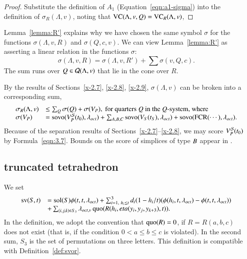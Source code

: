 \begin{proof} Substitute the definition of $A_1$
(Equation~\ref{eqn:a1-sigma}) into the definition of
$\sigma_R(\Lambda,v)$, noting that ${\operatorname{VC}}(\Lambda,v,Q) 
= {\operatorname{VC}}_{R}(\Lambda,v)$,
\end{proof}

\begin{remark}   Lemma~\ref{lemma:R'} explains why we have chosen
the same symbol $\sigma$ for the functions $\sigma(\Lambda,v,R)$ and
$\sigma(Q,c,v)$.  We can view Lemma~\ref{lemma:R'} as asserting a
linear relation in the functions $\sigma$:
   $$\sigma(\Lambda,v,R) = \sigma(\Lambda,v,R') + \sum \sigma(v,Q,c).$$
The sum runs over $Q\in{\mathcal Q}(\Lambda,v)$ that lie in the cone over $R$.
\end{remark}


By the results of Sections~\ref{x-2.7}, \ref{x-2.8}, \ref{x-2.9},
$\sigma(\Lambda,v)$ can be broken into a corresponding sum,
    $$
    \begin{array}{lll}
    \sigma_R(\Lambda,v) &\le \sum_Q \sigma(Q) + \sigma(V_P),
                \hbox{ for quarters $Q$ in the $Q$-system, where}\\
    \sigma(V_P) &= {\operatorname{sovo}}(V^{{\mathcal S}}_P(t_0),\lambda_{oct})+  \sum_{A,B,C} {\operatorname{sovo}}(V_S(t_S),\lambda_{oct})
        +{\operatorname{sovo}}({\operatorname{FCR}}(\cdots),\lambda_{oct}).\\
    \end{array}
    $$
Because of the separation
results of Sections~\ref{x-2.7}--\ref{x-2.8},  we may score
$V^{{\mathcal S}}_P(t_0)$ by Formula~\ref{eqn:3.7}. Bounds on the score of
simplices of type $B$ appear in .



\subsection{truncated tetrahedron}


We set
    \begin{equation}
    \begin{array}{lll}
    \op{sv}(S,t) &=
    \sol(S)\phi(t,t,\lambda_{oct})
    +\sum_{i=1,\ h_i\le t}^3 d_i (1-h_i/t) (\phi(h_i,t,\lambda_{oct})-
    \phi(t,t,\lambda_{oct})) \\
    &+\sum_{(i,j,k)\in S_3}
    \lambda_{oct,v}
    \quo(R(h_i,\eta(y_i,y_j,y_{k+3}),t)).
    \tlabel{eqn:3.5}
    \end{array}
    \end{equation}
In the definition, we adopt the convention that $\operatorname{quo}(R)=0$, if
$R=R(a,b,c)$ does not exist (that is, if the condition
    $0< a\le b\le c$
is violated). In the second sum, $S_3$ is the set of permutations
on three letters. This definition is compatible with
Definition~\ref{def:svor}.

